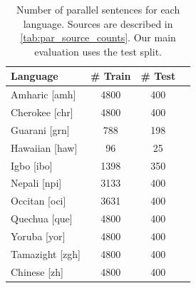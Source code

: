 \begin{table}[h!]
    \small
    \centering
        \begin{tabular}{l c c c}
            \toprule
            \textbf{Language} & \textbf{\# Train} & \textbf{\# Test} \\
            \midrule
            Amharic [amh] & 4800 & 400 \\ 
            Cherokee [chr] & 4800 & 400 \\ 
            Guarani [grn] & 788 & 198 \\ 
            Hawaiian [haw] & 96 & 25 \\ 
            Igbo [ibo] & 1398 & 350 \\ 
            Nepali [npi] & 3133 & 400 \\ 
            Occitan [oci] & 3631 & 400 \\ 
            Quechua [que] & 4800 & 400 \\ 
            Yoruba [yor] & 4800 & 400 \\ 
            Tamazight [zgh] & 4800 & 400 \\ 
            Chinese [zh] & 4800 & 400 \\ 
            \bottomrule
        \end{tabular}
    \caption{Number of parallel sentences for each language. Sources are described in \autoref{tab:par_source_counts}. Our main evaluation uses the test split.}
    \label{tab:bilingual}
\end{table}